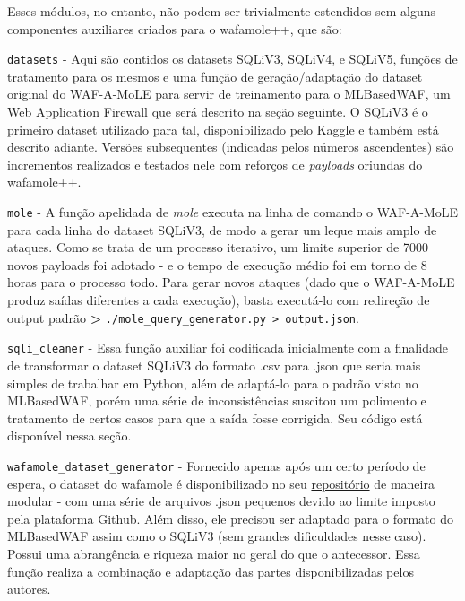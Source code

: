 Esses módulos, no entanto, não podem ser trivialmente estendidos sem alguns componentes auxiliares criados para o wafamole++, que são:
\begin{alineas}
\item \verb+datasets+ - Aqui são contidos os datasets SQLiV3, SQLiV4, e SQLiV5, funções de tratamento para os mesmos e uma função de geração/adaptação do dataset original do WAF-A-MoLE para servir de treinamento para o MLBasedWAF, um Web Application Firewall que será descrito na seção seguinte. O SQLiV3 é o primeiro dataset utilizado para tal, disponibilizado pelo Kaggle e também está descrito adiante. Versões subsequentes (indicadas pelos números ascendentes) são incrementos realizados e testados nele com reforços de \textit{payloads} oriundas do wafamole++.

\begin{alineas}
\item \verb+mole+ - A função apelidada de \textit{mole} executa na linha de comando o WAF-A-MoLE para cada linha do dataset SQLiV3, de modo a gerar um leque mais amplo de ataques. Como se trata de um processo iterativo, um limite superior de 7000 novos payloads foi adotado - e o tempo de execução médio foi em torno de 8 horas para o processo todo. Para gerar novos ataques (dado que o WAF-A-MoLE produz saídas diferentes a cada execução), basta executá-lo com redireção de output padrão \textbf{>} \verb+./mole_query_generator.py > output.json+.

\item \verb+sqli_cleaner+ - Essa função auxiliar foi codificada inicialmente com a finalidade de transformar o dataset SQLiV3 do formato .csv para .json que seria mais simples de trabalhar em Python, além de adaptá-lo para o padrão visto no MLBasedWAF, porém uma série de inconsistências suscitou um polimento e tratamento de certos casos para que a saída fosse corrigida. Seu código está disponível nessa seção.

\item \verb+wafamole_dataset_generator+ - Fornecido apenas após um certo período de espera, o dataset do wafamole é disponibilizado no seu \href{https://github.com/zangobot/wafamole_dataset}{repositório} de maneira modular - com uma série de arquivos .json pequenos devido ao limite imposto pela plataforma Github. Além disso, ele precisou ser adaptado para o formato do MLBasedWAF assim como o SQLiV3 (sem grandes dificuldades nesse caso). Possui uma abrangência e riqueza maior no geral do que o antecessor. Essa função realiza a combinação e adaptação das partes disponibilizadas pelos autores.


\end{alineas}
\end{alineas}
